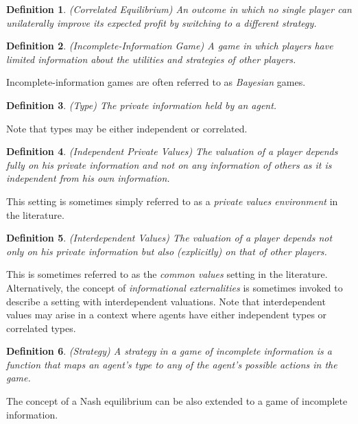 \documentclass{article}
\newtheorem{definition}{Definition}
\begin{document}
\begin{definition}
(Correlated Equilibrium) An outcome in which no single player can unilaterally improve its expected profit by switching to a different strategy.
\end{definition}

\begin{definition}
(Incomplete-Information Game) A game in which players have limited information about the utilities and strategies of other players.
\end{definition}

Incomplete-information games are often referred to as \textit{Bayesian} games.

\begin{definition}
(Type) The private information held by an agent.
\end{definition}

Note that types may be either independent or correlated. 

\begin{definition}
(Independent Private Values) The valuation of a player depends fully on his private information and not on any information of others as it is independent from his own information.
\end{definition}

This setting is sometimes simply referred to as a \textit{private values environment} in the literature.

\begin{definition}
(Interdependent Values) The valuation of a player depends not only on his private information but also (explicitly) on that of other players.
\end{definition}

This is sometimes referred to as the \textit{common values} setting in the literature. Alternatively, the concept of \textit{informational externalities} is sometimes invoked to describe a setting with interdependent valuations. Note that interdependent values may arise in a context where agents have either independent types or correlated types.

\begin{definition}
(Strategy) A strategy in a game of incomplete information is a function that maps an agent's type to
any of the agent's possible actions in the game.
\end{definition}

The concept of a Nash equilibrium can be also extended to a game of incomplete information.
\end{document}
